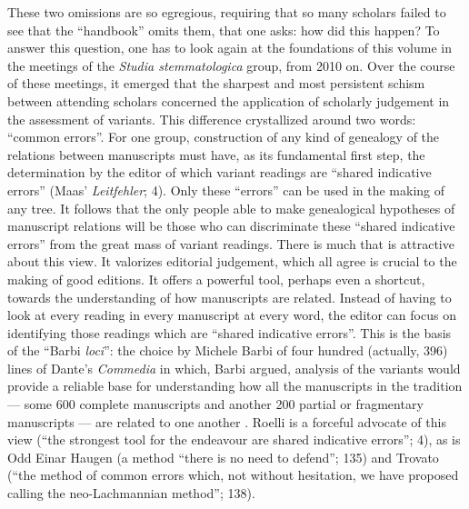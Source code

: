 \begin{review}
These two omissions are so egregious, requiring that so many
scholars failed to see that the ``handbook'' omits them, that one asks:
how did this happen? To answer this question, one has to look again at
the foundations of this volume in the meetings of the \emph{Studia
stemmatologica} group, from 2010 on. Over the course of these meetings,
it emerged that the sharpest and most persistent schism between
attending scholars concerned the application of scholarly judgement in
the assessment of variants. This difference crystallized around two
words: ``common errors''. For one group, construction of any kind of
genealogy of the relations between manuscripts must have, as its
fundamental first step, the determination by the editor of which variant
readings are ``shared indicative errors'' (Maas' \emph{Leitfehler}; 4).
Only these ``errors'' can be used in the making of any tree. It follows
that the only people able to make genealogical hypotheses of manuscript
relations will be those who can discriminate these ``shared indicative
errors'' from the great mass of variant readings. There is much that is
attractive about this view. It valorizes editorial judgement, which all
agree is crucial to the making of good editions. It offers a powerful
tool, perhaps even a shortcut, towards the understanding of how
manuscripts are related. Instead of having to look at every reading in
every manuscript at every word, the editor can focus on identifying
those readings which are ``shared indicative errors''. This is the basis
of the ``Barbi \emph{loci}'': the choice by Michele Barbi of four
hundred (actually, 396) lines of Dante's \emph{Commedia} in which, Barbi
argued, analysis of the variants would provide a reliable base for
understanding how all the manuscripts in the tradition –– some 600
complete manuscripts and another 200 partial or fragmentary manuscripts
–– are related to one another \parencite{barbi_canone_1891}. Roelli is a forceful
advocate of this view (``the strongest tool for the endeavour are shared
indicative errors''; 4), as is Odd Einar Haugen (a method ``there is no
need to defend''; 135) and Trovato (``the method of common errors which,
not without hesitation, we have proposed calling the neo-Lachmannian
method''; 138).


\end{review}
